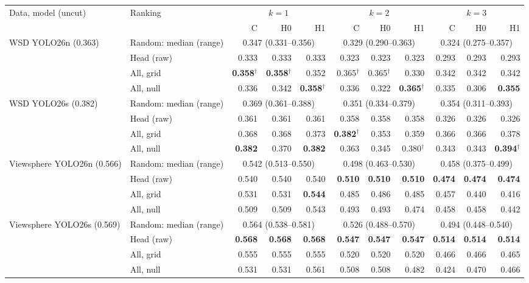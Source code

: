 \begin{tabular}{llrrrrrrrrr}
\toprule
Data, model (uncut) & Ranking & \multicolumn{3}{c}{$k=1$} & \multicolumn{3}{c}{$k=2$} & \multicolumn{3}{c}{$k=3$} \\
\cmidrule(lr){3-5}\cmidrule(lr){6-8}\cmidrule(lr){9-11}
 & & C & H0 & H1 & C & H0 & H1 & C & H0 & H1 \\
\midrule
WSD YOLO26n (0.363) & Random: median (range) & \multicolumn{3}{c}{0.347 (0.331--0.356)} & \multicolumn{3}{c}{0.329 (0.290--0.363)} & \multicolumn{3}{c}{0.324 (0.275--0.357)} \\
 & Head (raw) & 0.333 & 0.333 & 0.333 & 0.323 & 0.323 & 0.323 & 0.293 & 0.293 & 0.293 \\
 & All, grid & \textbf{0.358$^\dagger$} & \textbf{0.358$^\dagger$} & 0.352 & 0.365$^\dagger$ & 0.365$^\dagger$ & 0.330 & 0.342 & 0.342 & 0.342 \\
 & All, null & 0.336 & 0.342 & \textbf{0.358$^\dagger$} & 0.336 & 0.322 & \textbf{0.365$^\dagger$} & 0.335 & 0.306 & \textbf{0.355} \\
\midrule
WSD YOLO26s (0.382) & Random: median (range) & \multicolumn{3}{c}{0.369 (0.361--0.388)} & \multicolumn{3}{c}{0.351 (0.334--0.379)} & \multicolumn{3}{c}{0.354 (0.311--0.393)} \\
 & Head (raw) & 0.361 & 0.361 & 0.361 & 0.358 & 0.358 & 0.358 & 0.326 & 0.326 & 0.326 \\
 & All, grid & 0.368 & 0.368 & 0.373 & \textbf{0.382$^\dagger$} & 0.353 & 0.359 & 0.366 & 0.366 & 0.378 \\
 & All, null & \textbf{0.382} & 0.370 & \textbf{0.382} & 0.363 & 0.345 & 0.380$^\dagger$ & 0.343 & 0.343 & \textbf{0.394$^\dagger$} \\
\midrule
Viewsphere YOLO26n (0.566) & Random: median (range) & \multicolumn{3}{c}{0.542 (0.513--0.550)} & \multicolumn{3}{c}{0.498 (0.463--0.530)} & \multicolumn{3}{c}{0.458 (0.375--0.499)} \\
 & Head (raw) & 0.540 & 0.540 & 0.540 & \textbf{0.510} & \textbf{0.510} & \textbf{0.510} & \textbf{0.474} & \textbf{0.474} & \textbf{0.474} \\
 & All, grid & 0.531 & 0.531 & \textbf{0.544} & 0.485 & 0.486 & 0.485 & 0.457 & 0.440 & 0.416 \\
 & All, null & 0.509 & 0.509 & 0.543 & 0.493 & 0.493 & 0.474 & 0.458 & 0.458 & 0.442 \\
\midrule
Viewsphere YOLO26s (0.569) & Random: median (range) & \multicolumn{3}{c}{0.564 (0.538--0.581)} & \multicolumn{3}{c}{0.526 (0.488--0.570)} & \multicolumn{3}{c}{0.494 (0.448--0.540)} \\
 & Head (raw) & \textbf{0.568} & \textbf{0.568} & \textbf{0.568} & \textbf{0.547} & \textbf{0.547} & \textbf{0.547} & \textbf{0.514} & \textbf{0.514} & \textbf{0.514} \\
 & All, grid & 0.555 & 0.555 & 0.555 & 0.520 & 0.520 & 0.520 & 0.466 & 0.466 & 0.465 \\
 & All, null & 0.531 & 0.531 & 0.561 & 0.508 & 0.508 & 0.482 & 0.424 & 0.470 & 0.466 \\
\bottomrule
\end{tabular}
